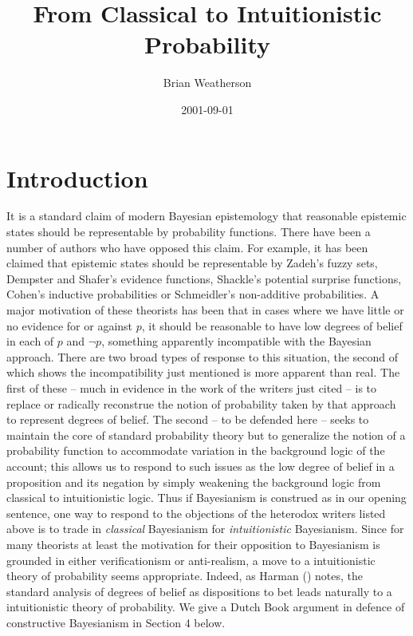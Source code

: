 \documentclass[
  11pt,
  letterpaper,
  DIV=11,
  numbers=noendperiod,
  oneside]{scrartcl}
\title{From Classical to Intuitionistic Probability}
\author{Brian Weatherson}
\date{2001-09-01}
\begin{document}
\maketitle
\section{Introduction}\label{introduction}

It is a standard claim of modern Bayesian epistemology that reasonable
epistemic states should be representable by probability functions. There
have been a number of authors who have opposed this claim. For example,
it has been claimed that epistemic states should be representable by
Zadeh's fuzzy sets, Dempster and Shafer's evidence functions, Shackle's
potential surprise functions, Cohen's inductive probabilities or
Schmeidler's non-additive probabilities. A major motivation of these
theorists has been that in cases where we have little or no evidence for
or against \(p\), it should be reasonable to have low degrees of belief
in each of \(p\) and \({\lnot}\)\(p\), something apparently incompatible
with the Bayesian approach. There are two broad types of response to
this situation, the second of which shows the incompatibility just
mentioned is more apparent than real. The first of these -- much in
evidence in the work of the writers just cited -- is to replace or
radically reconstrue the notion of probability taken by that approach to
represent degrees of belief. The second -- to be defended here -- seeks
to maintain the core of standard probability theory but to generalize
the notion of a probability function to accommodate variation in the
background logic of the account; this allows us to respond to such
issues as the low degree of belief in a proposition and its negation by
simply weakening the background logic from classical to intuitionistic
logic. Thus if Bayesianism is construed as in our opening sentence, one
way to respond to the objections of the heterodox writers listed above
is to trade in \emph{classical} Bayesianism for \emph{intuitionistic}
Bayesianism. Since for many theorists at least the motivation for their
opposition to Bayesianism is grounded in either verificationism or
anti-realism, a move to a intuitionistic theory of probability seems
appropriate. Indeed, as Harman () notes,
the standard analysis of degrees of belief as dispositions to bet leads
naturally to a intuitionistic theory of probability. We give a Dutch
Book argument in defence of constructive Bayesianism in Section 4 below.
\end{document}

